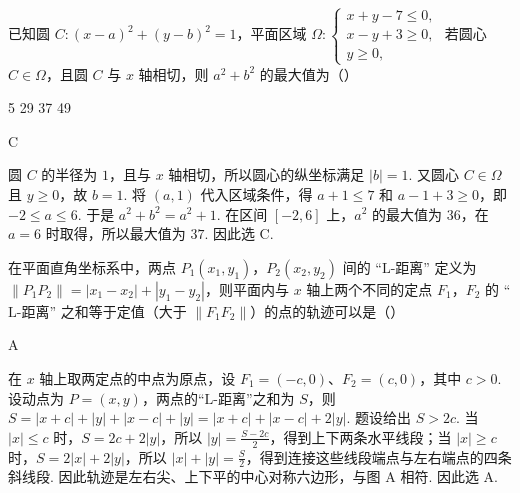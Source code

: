 \begin{problem}
已知圆 \(C: (x - a)^2 + (y - b)^2 = 1\)，平面区域 \(\Omega: \begin{cases}
x + y - 7 \leqslant 0,\\
x - y + 3 \geqslant 0,\\
y \geqslant 0,
\end{cases}\) 若圆心 \(C \in \Omega\)，且圆 \(C\) 与 \(x\) 轴相切，则 \(a^2 + b^2\) 的最大值为（\quad）

\choices
    {5}
    {29}
    {37}
    {49}

\begin{answer}
C
\end{answer}

\begin{solution}
圆 \(C\) 的半径为 \(1\)，且与 \(x\) 轴相切，所以圆心的纵坐标满足 \(|b|=1\). 又圆心 \(C\in\Omega\) 且 \(y\geqslant0\)，故 \(b=1\). 将 \((a,1)\) 代入区域条件，得 \(a+1\leqslant7\) 和 \(a-1+3\geqslant0\)，即 \(-2\leqslant a\leqslant6\). 于是 \(a^2+b^2=a^2+1\). 在区间 \([-2,6]\) 上，\(a^2\) 的最大值为 \(36\)，在 \(a=6\) 时取得，所以最大值为 \(37\). 因此选 C.
\end{solution}
\end{problem}

\begin{problem}
在平面直角坐标系中，两点 \(P_{1}(x_{1}, y_{1})\)，\(P_{2}(x_{2}, y_{2})\) 间的 “\(\mathrm{L}\)-距离” 定义为 \(\|P_1P_2\| = |x_1 - x_2| + |y_1 - y_2|\)，则平面内与 \(x\) 轴上两个不同的定点 \(F_{1}\)，\(F_{2}\) 的 “\(\mathrm{L}\)-距离” 之和等于定值（大于 \(\|F_1F_2\|\)）的点的轨迹可以是（\quad）

    {}
    {}
    {}

\begin{answer}
A
\end{answer}

\begin{solution}
在 \(x\) 轴上取两定点的中点为原点，设 \(F_1=(-c,0)\)、\(F_2=(c,0)\)，其中 \(c>0\). 设动点为 \(P=(x,y)\)，两点的“\(\mathrm{L}\)-距离”之和为 \(S\)，则 \(S=|x+c|+|y|+|x-c|+|y|=|x+c|+|x-c|+2|y|\). 题设给出 \(S>2c\). 当 \(|x|\leqslant c\) 时，\(S=2c+2|y|\)，所以 \(|y|=\frac{S-2c}{2}\)，得到上下两条水平线段；当 \(|x|\geqslant c\) 时，\(S=2|x|+2|y|\)，所以 \(|x|+|y|=\frac{S}{2}\)，得到连接这些线段端点与左右端点的四条斜线段. 因此轨迹是左右尖、上下平的中心对称六边形，与图 A 相符. 因此选 A.
\end{solution}
\end{problem}

